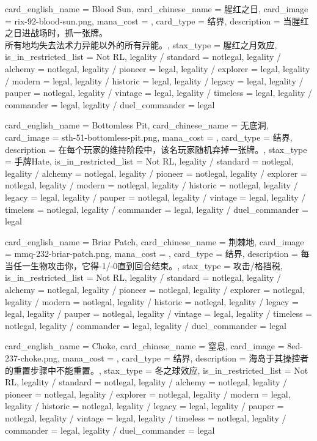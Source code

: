 \documentclass[lang = cn, color = black, 10pt]{AllThatStax}
\begin{document}
\card
{
	card_english_name = {Blood Sun},
	card_chinese_name = {腥红之日},
	card_image = rix-92-blood-sun.png,
	mana_cost = ,
	card_type = 结界,
	description = {当腥红之日进战场时，抓一张牌。\\
所有地均失去法术力异能以外的所有异能。},
	stax_type = 腥红之月效应,
	is_in_restricted_list = Not RL,
	legality / standard = notlegal,
	legality / alchemy = notlegal,
	legality / pioneer = legal,
	legality / explorer = legal,
	legality / modern = legal,
	legality / historic = legal,
	legality / legacy = legal,
	legality / pauper = notlegal,
	legality / vintage = legal,
	legality / timeless = legal,
	legality / commander = legal,
	legality / duel_commander = legal
}

\card
{
	card_english_name = {Bottomless Pit},
	card_chinese_name = {无底洞},
	card_image = sth-51-bottomless-pit.png,
	mana_cost = ,
	card_type = 结界,
	description = {在每个玩家的维持阶段中，该名玩家随机弃掉一张牌。},
	stax_type = 手牌Hate,
	is_in_restricted_list = Not RL,
	legality / standard = notlegal,
	legality / alchemy = notlegal,
	legality / pioneer = notlegal,
	legality / explorer = notlegal,
	legality / modern = notlegal,
	legality / historic = notlegal,
	legality / legacy = legal,
	legality / pauper = notlegal,
	legality / vintage = legal,
	legality / timeless = notlegal,
	legality / commander = legal,
	legality / duel_commander = legal
}

\card
{
	card_english_name = {Briar Patch},
	card_chinese_name = {荆棘地},
	card_image = mmq-232-briar-patch.png,
	mana_cost = ,
	card_type = 结界,
	description = {每当任一生物攻击你，它得-1/-0直到回合结束。},
	stax_type = 攻击/格挡税,
	is_in_restricted_list = Not RL,
	legality / standard = notlegal,
	legality / alchemy = notlegal,
	legality / pioneer = notlegal,
	legality / explorer = notlegal,
	legality / modern = notlegal,
	legality / historic = notlegal,
	legality / legacy = legal,
	legality / pauper = notlegal,
	legality / vintage = legal,
	legality / timeless = notlegal,
	legality / commander = legal,
	legality / duel_commander = legal
}

\card
{
	card_english_name = {Choke},
	card_chinese_name = {窒息},
	card_image = 8ed-237-choke.png,
	mana_cost = ,
	card_type = 结界,
	description = {海岛于其操控者的重置步骤中不能重置。},
	stax_type = 冬之球效应,
	is_in_restricted_list = Not RL,
	legality / standard = notlegal,
	legality / alchemy = notlegal,
	legality / pioneer = notlegal,
	legality / explorer = notlegal,
	legality / modern = legal,
	legality / historic = notlegal,
	legality / legacy = legal,
	legality / pauper = notlegal,
	legality / vintage = legal,
	legality / timeless = notlegal,
	legality / commander = legal,
	legality / duel_commander = legal
}
\end{document}
